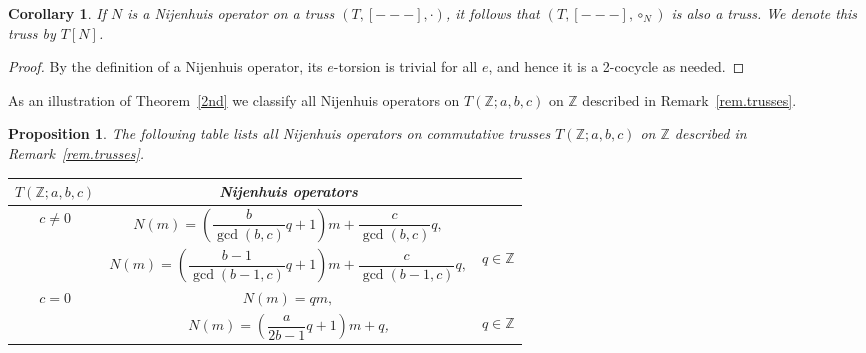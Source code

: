 \documentclass[pdftex]{sigma}
\numberwithin{equation}{section}
\newtheorem{Corollary}[Theorem]{Corollary}
\newtheorem{Proposition}[Theorem]{Proposition}
 { \theoremstyle{definition}
\newtheorem{Definition}[Theorem]{Definition}
\newtheorem{Note}[Theorem]{Note}
\newtheorem{Example}[Theorem]{Example}
\newtheorem{Remark}[Theorem]{Remark}}
\newcommand{\Z}{\mathbb Z}
\begin{document}
\begin{Corollary}\label{cor.Nij}
If $N$ is a Nijenhuis operator on a truss $(T,[---],\cdot)$, it follows that $(T,[---],\circ_{N})$ is also a truss. We denote this truss by $T[N]$.
\end{Corollary}

\begin{proof}
By the definition of a Nijenhuis operator, its $e$-torsion is trivial for all $e$, and hence it is a 2-cocycle as needed.
\end{proof}

As an illustration of Theorem~\ref{2nd} we classify all Nijenhuis operators on $T(\Z;a,b,c)$ on $\Z$ described in Remark~\ref{rem.trusses}.

\begin{Proposition}\label{prop.Nij.z}
The following table lists all Nijenhuis operators on commutative trusses $T(\Z;a,b,c)$ on $\Z$ described in Remark~{\rm \ref{rem.trusses}}.
 \begin{center}\renewcommand{\arraystretch}{1.8}
 \begin{tabular}{| c | c c |}
\hline
 $T(\Z;a,b,c)$ & {\rm Nijenhuis operators} &
 \\
\hline $c\neq 0$
 & $N(m) = \left(\dfrac{b}{\gcd(b,c)} q +1\right)m + \dfrac{c}{\gcd(b,c)} q,$
 &
 \\[1ex]
& $N(m) = \left(\dfrac{b-1}{\gcd(b-1,c)} q +1\right)m + \dfrac{c}{\gcd(b-1,c)} q,$ & $q\in \Z$ \\
\hline $c=0$
 & $N(m) = qm,$
 & {}
 \\
{} & $N(m)= \left(\dfrac{a}{2b-1} q +1\right) m +q $,
 & $q\in \Z$ \\ \hline
 \end{tabular}
 \end{center}
 \end{Proposition}
\end{document}
